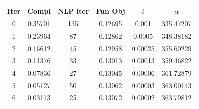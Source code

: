 \begin{tabular}{c c c c c c}
\toprule
Iter & Compl & NLP iter & Fun Obj & $t$ & $\alpha$ \\
\midrule
0 & 0.35701 & 135 & 0.12695 & 0.001 & 335.47207 \\
1 & 0.23964 & 87 & 0.12862 & 0.0005 & 348.38182 \\
2 & 0.16612 & 45 & 0.12958 & 0.00025 & 355.60229 \\
3 & 0.11376 & 33 & 0.13013 & 0.00013 & 359.46822 \\
4 & 0.07836 & 27 & 0.13045 & 0.00006 & 361.72879 \\
5 & 0.05127 & 50 & 0.13062 & 0.00003 & 363.00143 \\
6 & 0.03173 & 25 & 0.13072 & 0.00002 & 363.79812 \\
\bottomrule
\end{tabular}